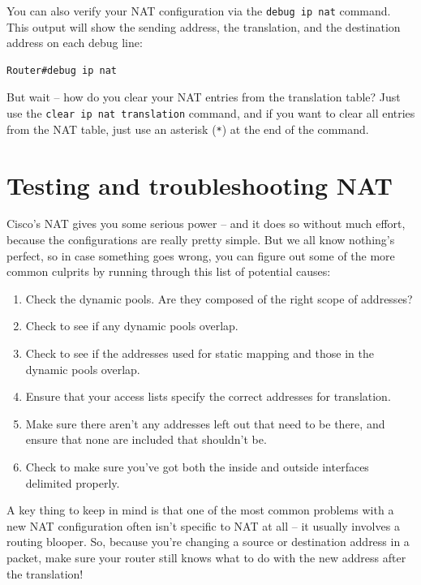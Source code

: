 \documentclass[b5paper,11pt]{memoir}
\begin{document}
You can also verify your NAT configuration via the
\texttt{debug\ ip\ nat} command. This output will show the sending
address, the translation, and the destination address on each debug
line:

\begin{verbatim}
Router#debug ip nat
\end{verbatim}

But wait -- how do you clear your NAT entries from the translation table?
Just use the \texttt{clear\ ip\ nat\ translation} command, and if you
want to clear all entries from the NAT table, just use an asterisk
(\texttt{*}) at the end of the command.



\section{Testing and troubleshooting NAT}

Cisco's NAT gives you some serious power -- and it does so without much
effort, because the configurations are really pretty simple. But we all
know nothing's perfect, so in case something goes wrong, you can figure
out some of the more common culprits by running through this list of
potential causes:

\begin{enumerate}
\tightlist
\item
  Check the dynamic pools. Are they composed of the right scope of
  addresses?
\item
  Check to see if any dynamic pools overlap.
\item
  Check to see if the addresses used for static mapping and those in the
  dynamic pools overlap.
\item
  Ensure that your
  access lists specify the correct addresses for translation.
\item
  Make sure there aren't any addresses left out that need to be there,
  and ensure that none are included that shouldn't be.
\item
  Check to make sure you've got both the inside and outside interfaces
  delimited properly.
\end{enumerate}

A key thing to keep in mind is that one of the most common problems with
a new NAT configuration often isn't specific to NAT at all -- it usually
involves a routing blooper. So, because you're changing a source or
destination address in a packet, make sure your router still knows what
to do with the new address after the translation!
\end{document}
